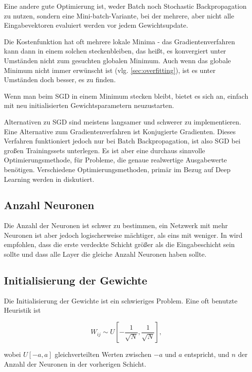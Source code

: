 Eine andere gute Optimierung ist, weder Batch noch Stochastic Backpropagation zu nutzen, sondern eine Mini-batch-Variante, bei der mehrere, aber nicht alle Eingabevektoren evaluiert werden vor jedem Gewichtsupdate. 

Die Kostenfunktion hat oft mehrere lokale Minima - das Gradientenverfahren kann dann in einem solchen steckenbleiben, das heißt, es konvergiert unter Umständen nicht zum gesuchten globalen Minimum. Auch wenn das globale Minimum nicht immer erwünscht ist (vlg. \ref{sec:overfitting}), ist es unter Umständen doch besser, es zu finden.

Wenn man beim SGD in einem Minimum stecken bleibt, bietet es sich an, einfach mit neu initialisierten Gewichtsparametern neuzustarten. 

Alternativen zu SGD sind meistens langsamer und schwerer zu implementieren. Eine Alternative zum Gradientenverfahren ist Konjugierte Gradienten. Dieses Verfahren funktioniert jedoch nur bei Batch Backpropagation, ist also SGD bei großen Trainingssets unterlegen. Es ist aber eine durchaus sinnvolle Optimierungsmethode, für Probleme, die genaue realwertige Ausgabewerte benötigen\cite{lecunefficient}.
Verschiedene Optimierungsmethoden, primär im Bezug auf Deep Learning werden in \cite{ngiam2011optimization} diskutiert.

\subsection{Anzahl Neuronen}
Die Anzahl der Neuronen ist schwer zu bestimmen, ein Netzwerk mit mehr Neuronen ist aber jedoch logischerweise mächtiger, als eins mit weniger. In \cite{bengio2012practical} wird empfohlen, dass die erste verdeckte Schicht größer als die Eingabeschicht sein sollte und dass alle Layer die gleiche Anzahl Neuronen haben sollte.

\subsection{Initialisierung der Gewichte}
Die Initialisierung der Gewichte ist ein schwieriges Problem. Eine oft benutzte Heuristik ist 

\begin{equation}
	W_{ij} \sim U [ -\frac{1}{\sqrt{N}} , \frac{1}{\sqrt{N}} ],
\end{equation}

wobei $U[-a, a]$ gleichverteilten Werten zwischen $-a$ und $a$ entspricht, und $n$ der Anzahl der Neuronen in der vorherigen Schicht. 

